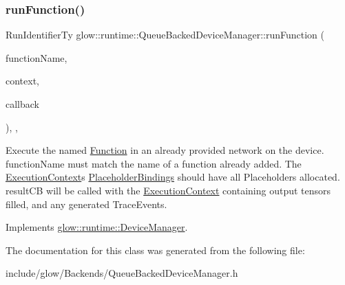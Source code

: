 \subsubsection{\texorpdfstring{run\+Function()}{runFunction()}}
{\footnotesize\ttfamily Run\+Identifier\+Ty glow\+::runtime\+::\+Queue\+Backed\+Device\+Manager\+::run\+Function (\begin{DoxyParamCaption}\item[{std\+::string}]{function\+Name,  }\item[{std\+::unique\+\_\+ptr$<$ \hyperlink{classglow_1_1_execution_context}{Execution\+Context} $>$}]{context,  }\item[{Result\+C\+B\+Ty}]{callback }\end{DoxyParamCaption})\hspace{0.3cm}{\ttfamily [inline]}, {\ttfamily [override]}, {\ttfamily [virtual]}}

Execute the named \hyperlink{classglow_1_1_function}{Function} in an already provided network on the device. function\+Name must match the name of a function already added. The \hyperlink{classglow_1_1_execution_context}{Execution\+Context}\textquotesingle{}s \hyperlink{classglow_1_1_placeholder_bindings}{Placeholder\+Bindings} should have all Placeholders allocated. result\+CB will be called with the \hyperlink{classglow_1_1_execution_context}{Execution\+Context} containing output tensors filled, and any generated Trace\+Events. 

Implements \hyperlink{classglow_1_1runtime_1_1_device_manager_ac182cdf6ed9f6903c11fa71c0446d1f7}{glow\+::runtime\+::\+Device\+Manager}.



The documentation for this class was generated from the following file\+:\begin{DoxyCompactItemize}
\item 
include/glow/\+Backends/Queue\+Backed\+Device\+Manager.\+h\end{DoxyCompactItemize}
